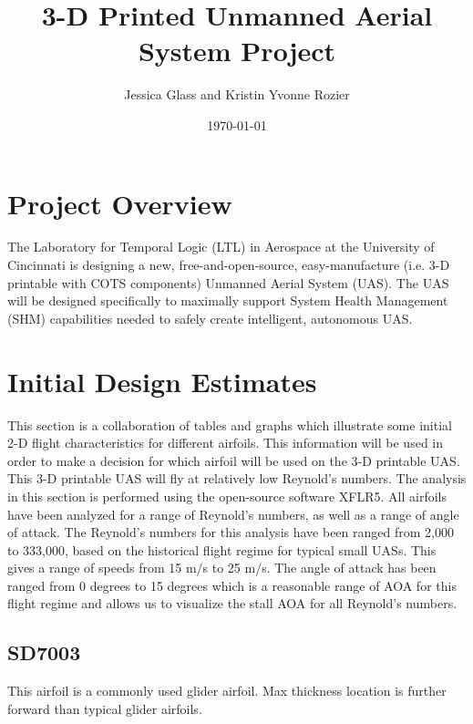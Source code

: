 \documentclass{article}
\title{3-D Printed Unmanned Aerial System Project}
\author{
Jessica Glass %
and Kristin Yvonne Rozier %
}
\affil{University of Cincinnati, Cincinnati, Ohio, USA \\
   \texttt{\{glassjp,rozierky\}@ucmail.uc.edu}
}
\date{\today}
\begin{document}
\maketitle

%
%
\tableofcontents


\section{Project Overview}
The Laboratory for Temporal Logic (LTL) in Aerospace at the University of Cincinnati is designing a new, free-and-open-source, easy-manufacture (i.e. 3-D printable with COTS components) Unmanned Aerial System (UAS). The UAS will be designed specifically to maximally support System Health Management (SHM) capabilities needed to safely create intelligent, autonomous UAS.

\section{Initial Design Estimates}
This section is a collaboration of tables and graphs which illustrate some initial 2-D flight characteristics for different airfoils.  This information will be used in order to make a decision for which airfoil will be used on the 3-D printable UAS.  This 3-D printable UAS will fly at relatively low Reynold's numbers.  The analysis in this section is performed using the open-source software XFLR5.  All airfoils have been analyzed for a range of Reynold's numbers, as well as a range of angle of attack.  The Reynold's numbers for this analysis have been ranged from 2,000 to 333,000, based on the historical flight regime for typical small UASs.  This gives a range of speeds from 15 m/s to 25 m/s. The angle of attack has been ranged from 0 degrees to 15 degrees which is a reasonable range of AOA for this flight regime and allows us to visualize the stall AOA for all Reynold's numbers.

\subsection{SD7003}
This airfoil is a commonly used glider airfoil. Max thickness location is further forward than typical glider airfoils.
\end{document}
